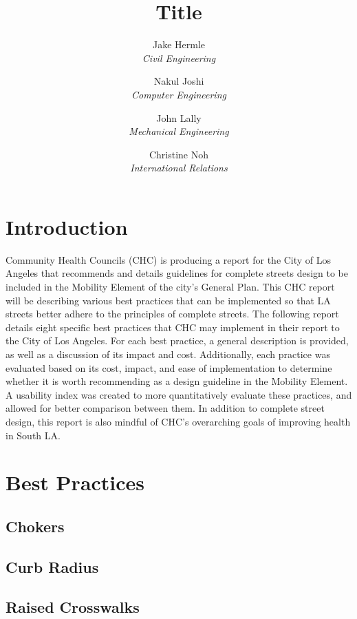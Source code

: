 \documentclass[titlepage]{article}
\title{Title}
\author{
	Jake Hermle\\ \emph{Civil Engineering} \and
	Nakul Joshi\\ \emph{Computer Engineering} \and
	John Lally\\ \emph{Mechanical Engineering}\and
	Christine Noh\\ \emph{International Relations}
}
\begin{document}
\maketitle

\begin{abstract}

\end{abstract}

\tableofcontents
\newpage
\listoffigures
\newpage
\listoftables
\newpage



\section{Introduction}

Community Health Councils (CHC) is producing a report for the City of Los Angeles that recommends and details guidelines for complete streets design to be included in the Mobility Element of the city’s General Plan. This CHC report will be describing various best practices that can be implemented so that LA streets better adhere to the principles of complete streets. The following report details eight specific best practices that CHC may implement in their report to the City of Los Angeles. For each best practice, a general description is provided, as well as a discussion of its impact and cost. Additionally, each practice was evaluated based on its cost, impact, and ease of implementation to determine whether it is worth recommending as a design guideline in the Mobility Element. A usability index was created to more quantitatively evaluate these practices, and allowed for better comparison between them. In addition to complete street design, this report is also mindful of CHC’s overarching goals of improving health in South LA.

\newpage

\section{Best Practices}
	\subsection{Chokers}
		
	\subsection{Curb Radius}
		
\newpage
	\subsection{Raised Crosswalks}
		
\end{document}
